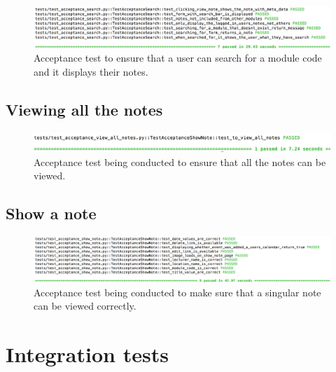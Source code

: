 \begin{figure}[H]
  \centering
  \includegraphics[width=\textwidth]{images/test_acceptance_search}
  \caption{Acceptance test to ensure that a user can search for a module code and it displays their notes.}
  \label{fig:search}
\end{figure}

\subsection{Viewing all the notes}

\begin{figure}[H]
  \centering
  \includegraphics[width=\textwidth]{images/test_acceptance_view_notes}
  \caption{Acceptance test being conducted to ensure that all the notes can be viewed.}
  \label{fig:acceptance_view_note}
\end{figure}
\subsection{Show a note}

\begin{figure}[H]
  \centering
  \includegraphics[width=\textwidth]{images/test_acceptance_show_note}
  \caption{Acceptance test being conducted to make sure that a singular note can be viewed correctly.}
  \label{fig:acceptance_homepage}
\end{figure}

\section{Integration tests}
\label{appendix:integration_tests}

